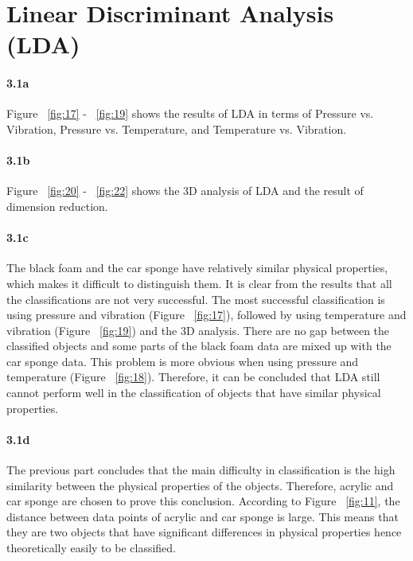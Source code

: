 \documentclass[10pt,twocolumn,letterpaper]{article}
\begin{document}
\section{Linear Discriminant Analysis (LDA)}

\paragraph{3.1a}
Figure ~\ref{fig:17} - ~\ref{fig:19} shows the results of LDA in terms of Pressure vs. Vibration, Pressure vs. Temperature, and Temperature vs. Vibration.

\paragraph{3.1b}
Figure ~\ref{fig:20} - ~\ref{fig:22} shows the 3D analysis of LDA and the result of dimension reduction.

\paragraph{3.1c}
The black foam and the car sponge have relatively similar physical properties, which makes it difficult to distinguish them. It is clear from the results that all the classifications are not very successful. The most successful classification is using pressure and vibration (Figure ~\ref{fig:17}), followed by using temperature and vibration (Figure ~\ref{fig:19}) and the 3D analysis. There are no gap between the classified objects and some parts of the black foam data are mixed up with the car sponge data. This problem is more obvious when using pressure and temperature (Figure ~\ref{fig:18}). Therefore, it can be concluded that LDA still cannot perform well in the classification of objects that have similar physical properties.

\paragraph{3.1d}
The previous part concludes that the main difficulty in classification is the high similarity between the physical properties of the objects. Therefore, acrylic and car sponge are chosen to prove this conclusion. According to Figure ~\ref{fig:11}, the distance between data points of acrylic and car sponge is large. This means that they are two objects that have significant differences in physical properties hence theoretically easily to be classified.\\
\end{document}
